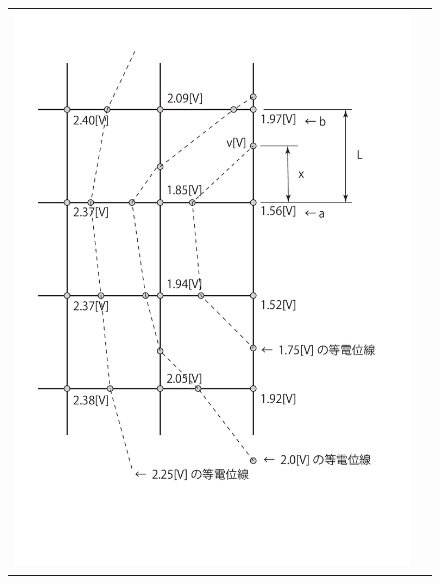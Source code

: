 \documentclass[uplatex,a4paper,11pt,oneside,openany]{jsbook}
\begin{document}
\begin{figure}[H]
  \centering
  \begin{tabular}{ll}
      \begin{minipage}[t]{0.9\hsize}
        \centering
  \includegraphics[scale=0.43]{./figure/potential.pdf}
      \end{minipage}
      \begin{minipage}[t]{0.1\hsize}
      \end{minipage}
    \end{tabular}
\end{figure}%

\newpage
\end{document}
